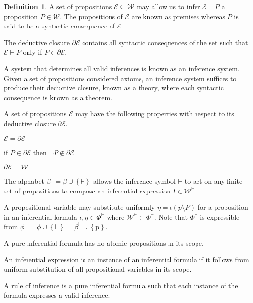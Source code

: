 \documentclass{amsbook}
\newcommand{\setsm}[1]{\left\{#1\right\}}
\newcommand{\wffs}{\mathcal W}
\newcommand{\infers}{\mathrel\vdash}
\theoremstyle{definition}
\newtheorem{dfn}{Definition}[section]
\begin{document}
\begin{dfn}
    A set of propositions $\mathcal E \subseteq \wffs$ may allow us to infer $\mathcal E \infers P$ a proposition $P \in \wffs$. The propositions of $\mathcal E$ are known as premises whereas $P$ is said to be a syntactic consequence of $\mathcal E$.

    The deductive closure $\partial \mathcal E$ contains all syntactic consequences of the set such that $\mathcal E \infers P$ only if $P \in \partial\mathcal E$.

    A system that determines all valid inferences is known as an inference system. Given a set of propositions considered axioms, an inference system suffices to produce their deductive closure, known as a theory, where each syntactic consequence is known as a theorem.

    A set of propositions $\mathcal E$ may have the following properties with respect to its deductive closure $\partial\mathcal E$.
    \begin{enumerate}[
            labelindent=\parindent,
            before={
                    \renewcommand\makelabel[1]{(##1).}
                }
        ]
        \item[deductively closed] $\mathcal E = \partial\mathcal E$
        \item[consistent] if $P \in \partial\mathcal E$ then $\neg P \notin \partial\mathcal E$
        \item[trivial] $\partial\mathcal E = \wffs$
    \end{enumerate}

    The alphabet $\beta^{\mathord\vdash} = \beta \cup \setsm{\mathord\vdash}$ allows the inference symbol $\mathord\vdash$ to act on any finite set of propositions to compose an inferential expression $I \in \wffs^{\mathord\vdash}$.

    A propositional variable may substitute uniformly $\eta = \iota(p \setminus P)$ for a proposition in an inferential formula $\iota, \eta \in \Phi^{\mathord\vdash}$ where $\wffs^{\mathord\vdash} \subset \Phi^{\mathord\vdash}$. Note that $\Phi^{\mathord\vdash}$ is expressible from $\phi^{\mathord\vdash} = \phi \cup \setsm{\mathord\vdash} = \beta^{\mathord\vdash} \cup \setsm{\mathrm p}$.

    A pure inferential formula has no atomic propositions in its scope.

    An inferential expression is an instance of an inferential formula if it follows from uniform substitution of all propositional variables in its scope.

    A rule of inference is a pure inferential formula such that each instance of the formula expresses a valid inference.
\end{dfn}
\end{document}
